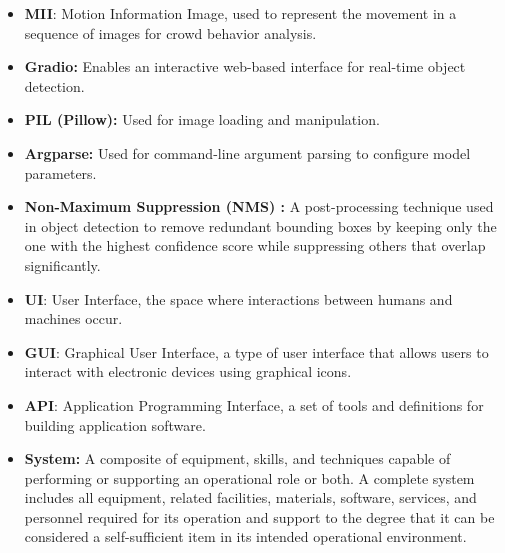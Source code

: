 \documentclass[11pt]{report}
\begin{document}
\begin{itemize}
    \item \textbf{MII}: Motion Information Image, used to represent the movement in a sequence of images for crowd behavior analysis.
    \item \textbf{Gradio:} Enables an interactive web-based interface for real-time object detection.
    \item \textbf{PIL (Pillow):} Used for image loading and manipulation.
    \item \textbf{Argparse:} Used for command-line  argument parsing to configure model parameters.
    \item \textbf{Non-Maximum Suppression (NMS) :} A post-processing technique used in object detection to remove redundant bounding boxes by keeping only the one with the highest confidence score while suppressing others that overlap significantly.
    \item \textbf{UI}: User Interface, the space where interactions between humans and machines occur.
    \item \textbf{GUI}: Graphical User Interface, a type of user interface that allows users to interact with electronic devices using graphical icons.
    \item \textbf{API}: Application Programming Interface, a set of tools and definitions for building application software.
    \item \textbf{System:} A composite of equipment, skills, and techniques capable of performing or supporting an operational role or both. A complete system includes all equipment, related facilities, materials, software, services, and personnel required for its operation and support to the degree that it can be considered a self-sufficient item in its intended operational environment.
\end{itemize}
\end{document}
